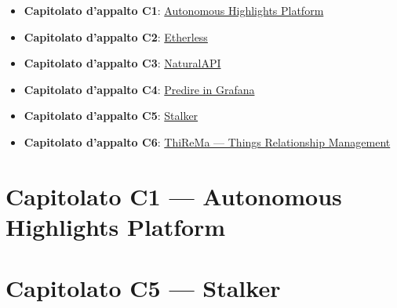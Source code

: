 \documentclass{article}
\begin{document}
\begin{itemize}
  \item \textbf{Capitolato d'appalto C1}: \href{https://www.math.unipd.it/~tullio/IS-1/2019/Progetto/C1.pdf}{Autonomous Highlights Platform}
  \item \textbf{Capitolato d'appalto C2}: \href{https://www.math.unipd.it/~tullio/IS-1/2019/Progetto/C2.pdf}{Etherless}
  \item \textbf{Capitolato d'appalto C3}: \href{https://www.math.unipd.it/~tullio/IS-1/2019/Progetto/C3.pdf}{NaturalAPI}
  \item \textbf{Capitolato d'appalto C4}: \href{https://www.math.unipd.it/~tullio/IS-1/2019/Progetto/C4.pdf}{Predire in Grafana}
  \item \textbf{Capitolato d'appalto C5}: \href{https://www.math.unipd.it/~tullio/IS-1/2019/Progetto/C5.pdf}{Stalker}
  \item \textbf{Capitolato d'appalto C6}: \href{https://www.math.unipd.it/~tullio/IS-1/2019/Progetto/C6.pdf}{ThiReMa --- Things Relationship Management}
\end{itemize}

%

\newpage
\section{Capitolato C1 --- Autonomous Highlights Platform}%
\label{sec:c1}


\newpage
\section{Capitolato C5 --- Stalker}%
\label{sec:c5}

\end{document}
